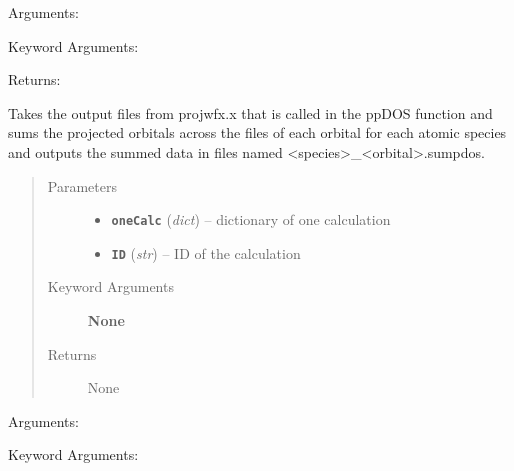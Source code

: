 \documentclass[letterpaper,10pt,english]{sphinxmanual}
\begin{document}

\begin{fulllineitems}
\label{plot:plot.__smoothGauss}
Arguments:

Keyword Arguments:

Returns:

\end{fulllineitems}


\begin{fulllineitems}
\label{plot:plot.__sumpdos}
Takes the output files from projwfx.x that is called in the ppDOS function and sums
the projected orbitals across the files of each orbital for each atomic species
and outputs the summed data in files named \textless{}species\textgreater{}\_\textless{}orbital\textgreater{}.sumpdos.
\begin{quote}\begin{description}
\item[{Parameters}] \leavevmode\begin{itemize}
\item {} 
\textbf{\texttt{oneCalc}} (\emph{dict}) -- dictionary of one calculation

\item {} 
\textbf{\texttt{ID}} (\emph{str}) -- ID of the calculation

\end{itemize}

\item[{Keyword Arguments}] \leavevmode
\textbf{None}

\item[{Returns}] \leavevmode
None

\end{description}\end{quote}

\end{fulllineitems}


\begin{fulllineitems}
\label{plot:plot.__transport_plot}
Arguments:

Keyword Arguments:

\end{fulllineitems}
\end{document}
